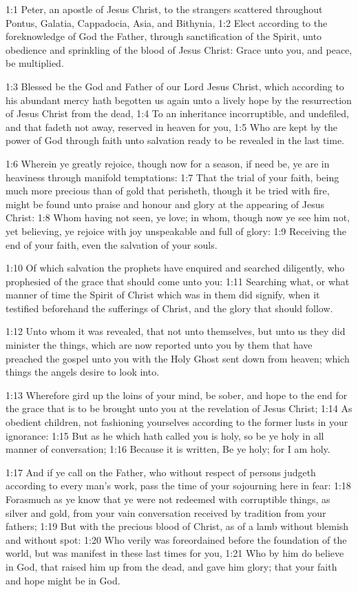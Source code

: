 

1:1 Peter, an apostle of Jesus Christ, to the strangers scattered
throughout Pontus, Galatia, Cappadocia, Asia, and Bithynia, 1:2 Elect
according to the foreknowledge of God the Father, through
sanctification of the Spirit, unto obedience and sprinkling of the
blood of Jesus Christ: Grace unto you, and peace, be multiplied.

1:3 Blessed be the God and Father of our Lord Jesus Christ, which
according to his abundant mercy hath begotten us again unto a lively
hope by the resurrection of Jesus Christ from the dead, 1:4 To an
inheritance incorruptible, and undefiled, and that fadeth not away,
reserved in heaven for you, 1:5 Who are kept by the power of God
through faith unto salvation ready to be revealed in the last time.

1:6 Wherein ye greatly rejoice, though now for a season, if need be,
ye are in heaviness through manifold temptations: 1:7 That the trial
of your faith, being much more precious than of gold that perisheth,
though it be tried with fire, might be found unto praise and honour
and glory at the appearing of Jesus Christ: 1:8 Whom having not seen,
ye love; in whom, though now ye see him not, yet believing, ye rejoice
with joy unspeakable and full of glory: 1:9 Receiving the end of your
faith, even the salvation of your souls.

1:10 Of which salvation the prophets have enquired and searched
diligently, who prophesied of the grace that should come unto you:
1:11 Searching what, or what manner of time the Spirit of Christ which
was in them did signify, when it testified beforehand the sufferings
of Christ, and the glory that should follow.

1:12 Unto whom it was revealed, that not unto themselves, but unto us
they did minister the things, which are now reported unto you by them
that have preached the gospel unto you with the Holy Ghost sent down
from heaven; which things the angels desire to look into.

1:13 Wherefore gird up the loins of your mind, be sober, and hope to
the end for the grace that is to be brought unto you at the revelation
of Jesus Christ; 1:14 As obedient children, not fashioning yourselves
according to the former lusts in your ignorance: 1:15 But as he which
hath called you is holy, so be ye holy in all manner of conversation;
1:16 Because it is written, Be ye holy; for I am holy.

1:17 And if ye call on the Father, who without respect of persons
judgeth according to every man's work, pass the time of your
sojourning here in fear: 1:18 Forasmuch as ye know that ye were not
redeemed with corruptible things, as silver and gold, from your vain
conversation received by tradition from your fathers; 1:19 But with
the precious blood of Christ, as of a lamb without blemish and without
spot: 1:20 Who verily was foreordained before the foundation of the
world, but was manifest in these last times for you, 1:21 Who by him
do believe in God, that raised him up from the dead, and gave him
glory; that your faith and hope might be in God.


